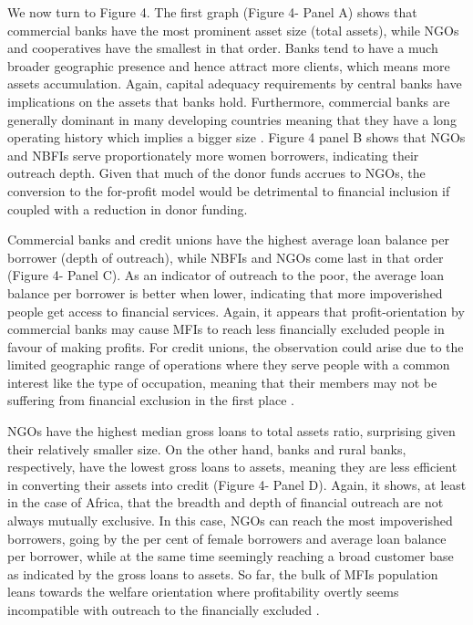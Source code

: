 \documentclass[a4paper,nobind]{templates/ociamthesis}
\begin{document}
We now turn to Figure 4. The first graph (Figure 4- Panel A) shows that commercial banks have the most prominent asset size (total assets), while NGOs and cooperatives have the smallest in that order. Banks tend to have a much broader geographic presence and hence attract more clients, which means more assets accumulation. Again, capital adequacy requirements by central banks have implications on the assets that banks hold. Furthermore, commercial banks are generally dominant in many developing countries meaning that they have a long operating history which implies a bigger size \autocite{levine2002bank}. Figure 4 panel B shows that NGOs and NBFIs serve proportionately more women borrowers, indicating their outreach depth. Given that much of the donor funds accrues to NGOs, the conversion to the for-profit model would be detrimental to financial inclusion if coupled with a reduction in donor funding.

Commercial banks and credit unions have the highest average loan balance per borrower (depth of outreach), while NBFIs and NGOs come last in that order (Figure 4- Panel C). As an indicator of outreach to the poor, the average loan balance per borrower is better when lower, indicating that more impoverished people get access to financial services. Again, it appears that profit-orientation by commercial banks may cause MFIs to reach less financially excluded people in favour of making profits. For credit unions, the observation could arise due to the limited geographic range of operations where they serve people with a common interest like the type of occupation, meaning that their members may not be suffering from financial exclusion in the first place \autocite{armendariz2013subsidy}.

NGOs have the highest median gross loans to total assets ratio, surprising given their relatively smaller size. On the other hand, banks and rural banks, respectively, have the lowest gross loans to assets, meaning they are less efficient in converting their assets into credit (Figure 4- Panel D). Again, it shows, at least in the case of Africa, that the breadth and depth of financial outreach are not always mutually exclusive. In this case, NGOs can reach the most impoverished borrowers, going by the per cent of female borrowers and average loan balance per borrower, while at the same time seemingly reaching a broad customer base as indicated by the gross loans to assets. So far, the bulk of MFIs population leans towards the welfare orientation where profitability overtly seems incompatible with outreach to the financially excluded \autocite{lopatta2016microfinance}.
\end{document}
